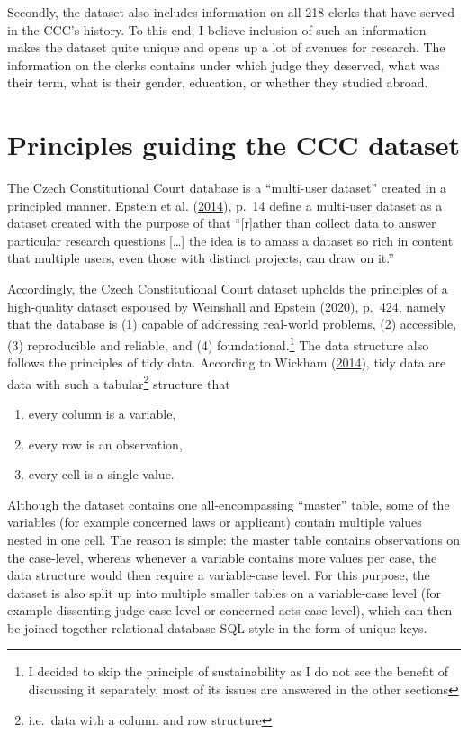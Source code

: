 \documentclass[
  11pt,
]{article}
\providecommand{\tightlist}{%
  \setlength{\itemsep}{0pt}\setlength{\parskip}{0pt}}
\begin{document}
Secondly, the dataset also includes information on all 218 clerks that
have served in the CCC's history. To this end, I believe inclusion of
such an information makes the dataset quite unique and opens up a lot of
avenues for research. The information on the clerks contains under which
judge they deserved, what was their term, what is their gender,
education, or whether they studied abroad.

\hypertarget{principles-guiding-the-ccc-dataset}{%
\section{Principles guiding the CCC
dataset}\label{principles-guiding-the-ccc-dataset}}

The Czech Constitutional Court database is a ``multi-user dataset''
created in a principled manner. Epstein et al.
(\protect\hyperlink{ref-epsteinIntroductionEmpiricalLegal2014}{2014}),
p.~14 define a multi-user dataset as a dataset created with the purpose
of that ``{[}r{]}ather than collect data to answer particular research
questions {[}\ldots{]} the idea is to amass a dataset so rich in content
that multiple users, even those with distinct projects, can draw on
it.''

Accordingly, the Czech Constitutional Court dataset upholds the
principles of a high-quality dataset espoused by Weinshall and Epstein
(\protect\hyperlink{ref-weinshallDevelopingHighQualityData2020}{2020}),
p.~424, namely that the database is (1) capable of addressing real-world
problems, (2) accessible, (3) reproducible and reliable, and (4)
foundational.\footnote{I decided to skip the principle of sustainability
  as I do not see the benefit of discussing it separately, most of its
  issues are answered in the other sections} The data structure also
follows the principles of tidy data. According to Wickham
(\protect\hyperlink{ref-wickhamTidyData2014}{2014}), tidy data are data
with such a tabular\footnote{i.e.~data with a column and row structure}
structure that

\begin{enumerate}
\def\labelenumi{(\arabic{enumi})}
\tightlist
\item
  every column is a variable,
\item
  every row is an observation,
\item
  every cell is a single value.
\end{enumerate}

Although the dataset contains one all-encompassing ``master'' table,
some of the variables (for example concerned laws or applicant) contain
multiple values nested in one cell. The reason is simple: the master
table contains observations on the case-level, whereas whenever a
variable contains more values per case, the data structure would then
require a variable-case level. For this purpose, the dataset is also
split up into multiple smaller tables on a variable-case level (for
example dissenting judge-case level or concerned acts-case level), which
can then be joined together relational database SQL-style in the form of
unique keys.
\end{document}
